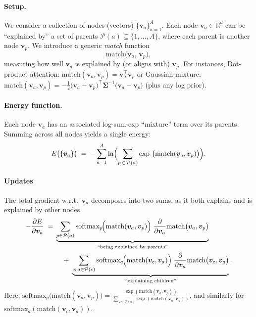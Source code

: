 \documentclass{article}
\begin{document}
\paragraph{Setup.}
We consider a collection of nodes (vectors) \(\{\bm{v}_a\}_{a=1}^A\).  Each node \(\bm{v}_a \in \mathbb{R}^d\) can be ``explained by'' a set of parents \(\mathcal{P}(a)\subseteq\{1,\ldots,A\}\), where each parent is another node \(\bm{v}_p\).  We introduce a generic \emph{match} function
\[
\mathrm{match}\bigl(\bm{v}_a,\,\bm{v}_p\bigr),
\]
measuring how well \(\bm{v}_a\) is explained by (or aligns with) \(\bm{v}_p\). For instances,  Dot-product attention: \(\mathrm{match}(\bm{v}_a,\bm{v}_p) = \bm{v}_a^\top \bm{v}_p\) or Gaussian-mixture: \(\mathrm{match}(\bm{v}_a,\bm{v}_p) 
= -\tfrac12\bigl(\bm{v}_a - \bm{v}_p\bigr)^\top \bm{\Sigma}^{-1}\bigl(\bm{v}_a - \bm{v}_p\bigr)\) (plus any log prior).


\paragraph{Energy function.}
Each node \(\bm{v}_a\) has an associated log-sum-exp ``mixture'' term over its parents.  Summing across all nodes yields a single energy:
\begin{equation}
E\bigl(\{\bm{v}_a\}\bigr)
\;=\;
-\sum_{a=1}^A
\ln \Bigl(\sum_{p \,\in\, \mathcal{P}(a)} 
\exp\ \bigl(\mathrm{match} (\bm{v}_a,\bm{v}_p)\bigr)\Bigr).
\label{eq:general-energy}
\end{equation}

\paragraph{Updates}

The total gradient w.r.t.\ \(\bm{v}_a\) decomposes into two sums, as it both explains and is explained by other nodes.
\begin{align}
    -\frac{\partial E}{\partial \bm{v}_a}
    \;=\;&
    \underbrace{\sum_{p \in \mathcal{P}(a)} 
    \text{softmax}_{p}\!\Bigl(\mathrm{match}(\bm{v}_a,\bm{v}_p)\Bigr)
    \;\frac{\partial}{\partial \bm{v}_a}
    \mathrm{match}\bigl(\bm{v}_a,\bm{v}_p\bigr)}_{\text{``being explained by parents''}} \nonumber \\
    &\quad+\;
    \underbrace{\sum_{c :\, a \in \mathcal{P}(c)} 
    \text{softmax}_{a}\!\Bigl(\mathrm{match}(\bm{v}_c,\bm{v}_a)\Bigr)
    \;\frac{\partial}{\partial \bm{v}_a}
    \mathrm{match}\bigl(\bm{v}_c,\bm{v}_a\bigr)}_{\text{``explaining children''}}.
    \label{eq:generic-gradient}
    \end{align}
Here, 
\(\text{softmax}_{p}\!\bigl(\mathrm{match}(\bm{v}_a,\bm{v}_p)\bigr) 
= \frac{\exp(\mathrm{match}(\bm{v}_a,\bm{v}_p))}
       {\sum_{u \in \mathcal{P}(a)} \exp(\mathrm{match}(\bm{v}_a,\bm{v}_u))}\), 
and similarly for \(\text{softmax}_{a}(\mathrm{match}(\bm{v}_c,\bm{v}_a))\).
\end{document}
